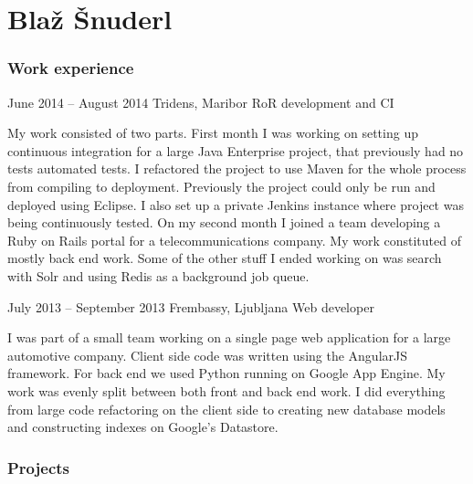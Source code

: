 \documentclass{tccv}
\begin{document}
\part{Blaž Šnuderl}

\section{Work experience}

\begin{eventlist}

\item{June 2014 -- August 2014}
     {Tridens, Maribor}
     {RoR development and CI}

My work consisted of two parts. First month I was working on setting up continuous integration for a large Java Enterprise project, that previously had no tests automated tests. I refactored the project to use Maven for the whole process from compiling to deployment. Previously the project could only be run and deployed using Eclipse. I also set up a private Jenkins instance where project was being continuously tested. 
\newline
On my second month I joined a team developing a Ruby on Rails portal for a telecommunications company. My work constituted of mostly back end work. Some of the other stuff I ended working on was search with Solr and using Redis as a background job queue.

\item{July 2013 -- September 2013}
     {Frembassy, Ljubljana}
     {Web developer}
     
I was part of a small team working on a single page web application for a large automotive company. Client side code was written using the AngularJS framework. For back end we used Python running on Google App Engine. My work was evenly split between both front and back end work. I did everything from large code refactoring on the client side to creating new database models and constructing indexes on Google's Datastore.

\end{eventlist}


\section{Projects}
\end{document}
